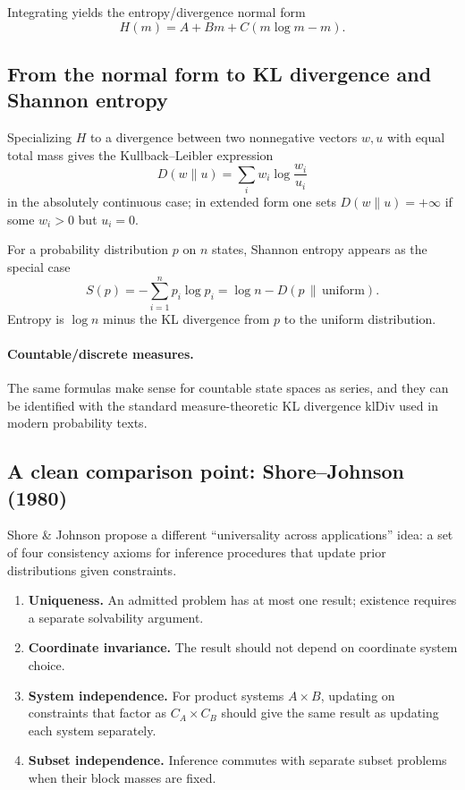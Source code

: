 \documentclass[11pt]{article}
\theoremstyle{definition}
\theoremstyle{remark}
\begin{document}
Integrating yields the entropy/divergence normal form
\[
H(m)=A + Bm + C(m\log m - m).
\]

\subsection{From the normal form to KL divergence and Shannon entropy}

Specializing $H$ to a divergence between two nonnegative vectors $w,u$ with equal total mass gives
the Kullback--Leibler expression
\[
D(w\|u)=\sum_i w_i\log\frac{w_i}{u_i}
\]
in the absolutely continuous case; in extended form one sets $D(w\|u)=+\infty$ if some $w_i>0$ but $u_i=0$.

For a probability distribution $p$ on $n$ states, Shannon entropy appears as the special case
\[
S(p) = -\sum_{i=1}^n p_i\log p_i = \log n - D(p\,\|\,\mathrm{uniform}).
\]
Entropy is $\log n$ minus the KL divergence from $p$ to the uniform distribution.

\paragraph{Countable/discrete measures.}
The same formulas make sense for countable state spaces as series, and they can be identified with the
standard measure-theoretic KL divergence $\mathrm{klDiv}$ used in modern probability texts.

\subsection{A clean comparison point: Shore--Johnson (1980)}

Shore \& Johnson propose a different ``universality across applications'' idea: a set of four
consistency axioms for inference procedures that update prior distributions given constraints.
\begin{enumerate}
  \item \textbf{Uniqueness.} An admitted problem has at most one result; existence requires a separate solvability argument.
  \item \textbf{Coordinate invariance.} The result should not depend on coordinate system choice.
  \item \textbf{System independence.} For product systems $A \times B$, updating on constraints that
    factor as $C_A \times C_B$ should give the same result as updating each system separately.
  \item \textbf{Subset independence.} Inference commutes with separate subset problems when their block masses are fixed.
\end{enumerate}
\end{document}

